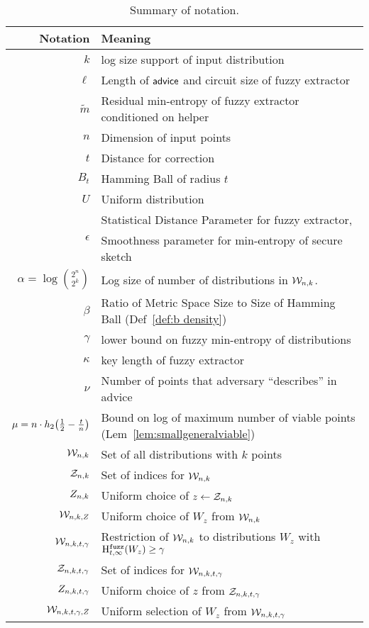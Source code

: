 \begin{table}
\centering
\begin{tabular}{r | l}
Notation & Meaning\\\hline
$k$ & log size support of input distribution\\
$\ell$ & Length of ${\mathsf{advice}}$ and circuit size of fuzzy extractor\\
$\tilde{m}$ & Residual min-entropy of fuzzy extractor conditioned on helper\\
$n$ & Dimension of input points\\
$t$ & Distance for correction\\
$B_t$ & Hamming Ball of radius $t$\\
$U$ & Uniform distribution\\
\multirow{2}{*}{$\epsilon$} & Statistical Distance Parameter for fuzzy extractor,\\
& Smoothness parameter for min-entropy of secure sketch\\
$\alpha = \log{{2^n\choose 2^k}}$ & Log size of number of distributions in $\mathcal{W}_{n,k}$.  \\
$\beta$ & Ratio of Metric Space Size to Size of Hamming Ball (Def~\ref{def:b density})\\
$\gamma$ & lower bound on fuzzy min-entropy of distributions \\
$\kappa$ & key length of fuzzy extractor\\
$\nu$ & Number of points that adversary ``describes'' in advice\\
$\mu =  n \cdot h_2\!\left(\frac{1}{2} - \frac{t}{n}\right)$ & Bound on log of maximum number of viable points (Lem~\ref{lem:smallgeneralviable})\\\hline
$\mathcal{W}_{n,k}$ & Set of all distributions with $k$ points\\
$\mathcal{Z}_{n,k}$ & Set of indices for $\mathcal{W}_{n,k}$\\
$Z_{n,k}$ & Uniform choice of $z\leftarrow \mathcal{Z}_{n,k}$\\
$\mathcal{W}_{n,k, Z}$ & Uniform choice of $W_z$ from $\mathcal{W}_{n,k}$\\
$\mathcal{W}_{n,k,t,\gamma}$ & Restriction of $\mathcal{W}_{n,k}$ to distributions $W_z$ with $\mathrm{H}^{\mathtt{fuzz}}_{t,\infty}(W_z)\ge \gamma$\\
$\mathcal{Z}_{n,k,t,\gamma}$ & Set of indices for $\mathcal{W}_{n,k,t,\gamma}$\\
$Z_{n,k,t,\gamma}$ & Uniform choice of $z$ from $\mathcal{Z}_{n,k,t,\gamma}$\\
$\mathcal{W}_{n,k,t,\gamma, Z}$ & Uniform selection of $W_z$ from $\mathcal{W}_{n,k,t,\gamma}$

\end{tabular}
\caption{Summary of notation.}
\label{tab:notation}
\end{table}
